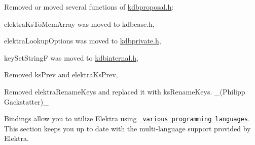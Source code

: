 \begin{DoxyItemize}
\item Removed or moved several functions of {\ttfamily \mbox{\hyperlink{kdbproposal_8h}{kdbproposal.\+h}}}\+:
\begin{DoxyItemize}
\item {\ttfamily elektra\+Ks\+To\+Mem\+Array} was moved to {\ttfamily kdbease.\+h},
\item {\ttfamily elektra\+Lookup\+Options} was moved to {\ttfamily \mbox{\hyperlink{kdbprivate_8h}{kdbprivate.\+h}}},
\item {\ttfamily key\+Set\+StringF} was moved to {\ttfamily \mbox{\hyperlink{kdbinternal_8h}{kdbinternal.\+h}}},
\item Removed {\ttfamily ks\+Prev} and {\ttfamily elektra\+Ks\+Prev},
\item Removed {\ttfamily elektra\+Rename\+Keys} and replaced it with {\ttfamily ks\+Rename\+Keys}. \+\_\+(\+Philipp Gackstatter)\+\_\+
\end{DoxyItemize}
\end{DoxyItemize}

Bindings allow you to utilize Elektra using \href{https://www.libelektra.org/bindings/readme}{\texttt{ various programming languages}}. This section keeps you up to date with the multi-\/language support provided by Elektra.


